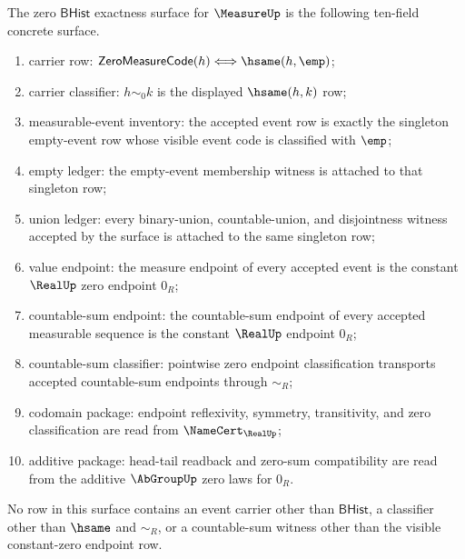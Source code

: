 \begin{definition}
\label{def:measure-zero-bhist-exactness-surface}
The zero $\mathsf{BHist}$ exactness surface for $\MeasureUp$ is the following
ten-field concrete surface.
\begin{enumerate}
  \item carrier row:
  $\mathsf{ZeroMeasureCode}(h)\Longleftrightarrow \hsame(h,\emp)$;
  \item carrier classifier: $h\sim_0 k$ is the displayed $\hsame(h,k)$ row;
  \item measurable-event inventory: the accepted event row is exactly the
  singleton empty-event row whose visible event code is classified with
  $\emp$;
  \item empty ledger: the empty-event membership witness is attached to that
  singleton row;
  \item union ledger: every binary-union, countable-union, and disjointness
  witness accepted by the surface is attached to the same singleton row;
  \item value endpoint: the measure endpoint of every accepted event is the
  constant $\RealUp$ zero endpoint $0_R$;
  \item countable-sum endpoint: the countable-sum endpoint of every accepted
  measurable sequence is the constant $\RealUp$ endpoint $0_R$;
  \item countable-sum classifier: pointwise zero endpoint classification
  transports accepted countable-sum endpoints through $\sim_R$;
  \item codomain package: endpoint reflexivity, symmetry, transitivity, and
  zero classification are read from $\NameCert_{\RealUp}$;
  \item additive package: head-tail readback and zero-sum compatibility are
  read from the additive $\AbGroupUp$ zero laws for $0_R$.
\end{enumerate}
No row in this surface contains an event carrier other than $\mathsf{BHist}$,
a classifier other than $\hsame$ and $\sim_R$, or a countable-sum witness
other than the visible constant-zero endpoint row.
\end{definition}


